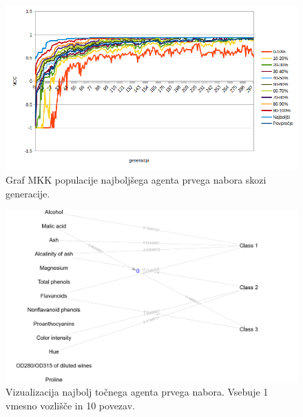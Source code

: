 \begin{figure}[H]
    \begin{center}
        \includegraphics[width=13cm]{wine/1/mcc}
    \end{center}
    \caption{Graf MKK populacije najboljšega agenta prvega nabora skozi generacije.}
    \label{fig:wine_mcc_1}
\end{figure}

\begin{figure}[H]
    \begin{center}
        \includegraphics[width=13cm]{wine/1/acc_g}
    \end{center}
    \caption{Vizualizacija najbolj točnega agenta prvega nabora. Vsebuje 1 vmesno vozlišče in 10 povezav.}
    \label{fig:wine_acc_1_g}
\end{figure}

